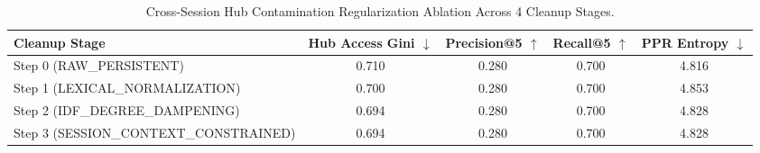 \begin{table}[t]
\centering
\small
\caption{Cross-Session Hub Contamination Regularization Ablation Across 4 Cleanup Stages.}
\label{tab:hub_cleanup_ablation}
\begin{tabular}{lcccc}
\toprule
\textbf{Cleanup Stage} & \textbf{Hub Access Gini $\downarrow$} & \textbf{Precision@5 $\uparrow$} & \textbf{Recall@5 $\uparrow$} & \textbf{PPR Entropy $\downarrow$} \\
\midrule
Step 0 (RAW_PERSISTENT) & 0.710 & 0.280 & 0.700 & 4.816 \\
Step 1 (LEXICAL_NORMALIZATION) & 0.700 & 0.280 & 0.700 & 4.853 \\
Step 2 (IDF_DEGREE_DAMPENING) & 0.694 & 0.280 & 0.700 & 4.828 \\
Step 3 (SESSION_CONTEXT_CONSTRAINED) & 0.694 & 0.280 & 0.700 & 4.828 \\
\bottomrule
\end{tabular}
\end{table}